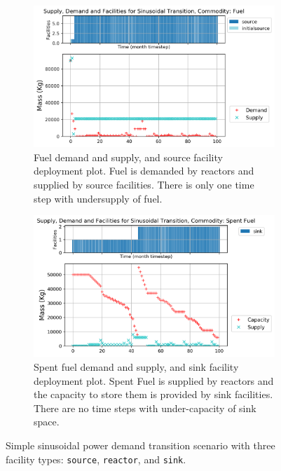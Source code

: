     \begin{figure}[]
        \centering
        \begin{subfigure}[t]{\textwidth}
            \centering
            \includegraphics[width=0.9\linewidth]{figures/sinetransition-fuel.png} 
            \caption{Fuel demand and supply, and source facility deployment plot.
            Fuel is demanded by reactors and supplied by source facilities.
            There is only one time step with undersupply of fuel.}
            \label{fig:sinetransition-fuel}
        \end{subfigure}
        \begin{subfigure}[t]{\textwidth}
            \centering
            \includegraphics[width=0.9\linewidth]{figures/sinetransition-spentfuel.png} 
            \caption{Spent fuel demand and supply, and sink facility deployment plot.
                Spent Fuel is supplied by reactors and the capacity to store them 
                is provided by sink facilities.
            There are no time steps with under-capacity of sink space.}
            \label{fig:sinetransition-spentfuel}
        \end{subfigure}
        \caption{Simple sinusoidal power demand transition scenario with 
        three facility types: \texttt{source}, \texttt{reactor}, and \texttt{sink}.}
    \end{figure}

